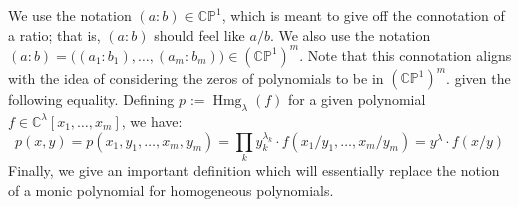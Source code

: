 \documentclass{article}
\theoremstyle{definition}
\newtheorem{remark}[theorem]{Remark}
\theoremstyle{plain}
\newcommand{\C}{\mathbb{C}}
\newcommand{\N}{\mathbb{N}}
\newcommand{\CP}{\mathbb{CP}}
\DeclareMathOperator{\Hmg}{Hmg}
\begin{document}

    We use the notation $(a:b) \in \CP^1$, which is meant to give off the connotation of a ratio; that is, $(a:b)$ should feel like $a/b$. We also use the notation $(a:b) = \big((a_1:b_1), \ldots, (a_m:b_m)\big) \in (\CP^1)^m$. Note that this connotation aligns with the idea of considering the zeros of polynomials to be in $(\CP^1)^m$. given the following equality. Defining $p := \Hmg_\lambda(f)$ for a given polynomial $f \in \C^\lambda[x_1,\ldots,x_m]$, we have:
    \[
        p(x,y) = p(x_1,y_1,\ldots,x_m,y_m) = \prod_k y_k^{\lambda_k} \cdot f(x_1/y_1,\ldots,x_m/y_m) = y^\lambda \cdot f(x/y)
    \]
%
%
Finally, we give an important definition which will essentially replace the notion of a monic polynomial for homogeneous polynomials.
\end{document}
